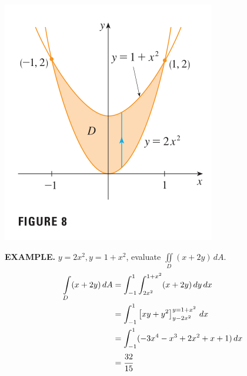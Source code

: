 \documentclass{article}
\begin{document}
\begin{minipage}[]{0.3\linewidth}
  \begin{center}
    \includegraphics[width = 4.3 cm]{images/type1eg1.png} 
  \end{center}
  \end{minipage}
\begin{minipage}[]{0.67\linewidth}
{\selectfont \textbf{\textcolor{blue5}{ EXAMPLE.}}} $y = 2x^2, y = 1 + x^2$, evaluate $\iint \limits_{D} (x + 2y) \, dA$.
\begin{equation*}
  \begin{split}
    \int \limits_{D } (x + 2y) \, dA & = \int_{-1}^1 \int_{2x^2}^{1+x^2} (x + 2y)  \, dy \, dx \\
                                     & = \int_{-1}^1 \left[ xy + y^2 \right]_{y - 2x^2}^{y = 1 + x^2}   \, dx \\
                                     & =  \int_{-1}^1 (-3x^4 - x^3 + 2x^2 + x + 1 ) \, dx \\ 
                                     & = \cfrac{32}{15} 
  \end{split}
\end{equation*}
\end{minipage}
 
\end{document}
